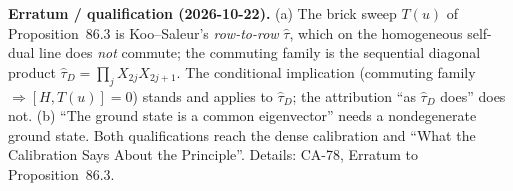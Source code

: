 \textbf{Erratum / qualification (2026-10-22).}  (a) The brick sweep \(T(u)\) of Proposition~86.3 is Koo--Saleur's
\emph{row-to-row} \(\hat\tau\), which on the homogeneous self-dual line does \emph{not} commute; the commuting family is the
sequential diagonal product \(\hat\tau_D=\prod_jX_{2j}X_{2j+1}\).  The conditional implication (commuting family
\(\Rightarrow[H,T(u)]=0\)) stands and applies to \(\hat\tau_D\); the attribution ``as \(\hat\tau_D\) does'' does not.
(b) ``The ground state is a common eigenvector'' needs a nondegenerate ground state.  Both qualifications reach the
dense calibration and ``What the Calibration Says About the Principle''.  Details: CA-78, Erratum to Proposition~86.3.
